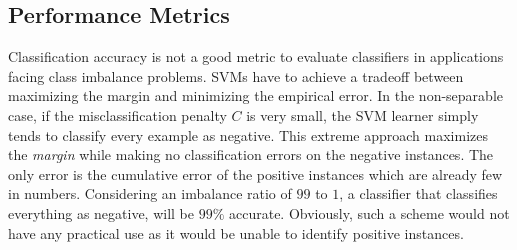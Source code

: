 

\subsection{Performance Metrics}
Classification accuracy is not a good metric to evaluate classifiers in applications facing class imbalance problems.  SVMs have to achieve a tradeoff between maximizing the margin and minimizing the empirical error. In the non-separable case, if the misclassification penalty $C$ is very small, the SVM learner simply tends to classify every example as negative. This extreme approach maximizes the \textit{margin} while making no classification errors on the negative instances. The only error is the cumulative error of the positive instances which are already few in numbers. Considering an imbalance ratio of $99$ to $1$, a classifier that classifies everything as negative, will be $99\%$ accurate. Obviously,  such a scheme would not have any practical use as it would be unable to identify  positive instances.

